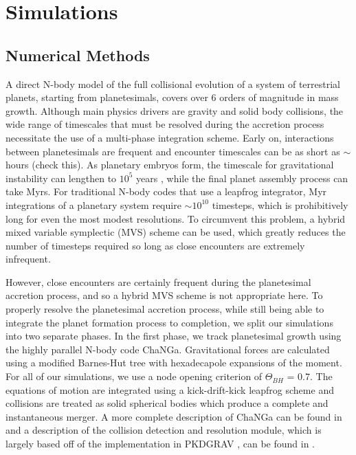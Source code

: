 \section{Simulations} \label{sec:simulations}

\subsection{Numerical Methods} \label{sec:numerical}

A direct N-body model of the full collisional evolution of a system of terrestrial planets, starting from planetesimals, covers over 
6 orders of magnitude in mass growth. Although main physics drivers are gravity and solid body collisions, the wide range of 
timescales that must be resolved during the accretion process necessitate the use of a multi-phase integration scheme. Early 
on, interactions between planetesimals are frequent and encounter timescales can be as short as $\sim$ hours (check this). 
As planetary embryos form, the timescale for gravitational instability can lengthen to $10^{5}$ years \cite{chambers96}, while 
the final planet assembly process can take Myrs. For traditional N-body codes that use a leapfrog integrator, Myr integrations 
of a planetary system require $\sim 10^{10}$ timesteps, which is prohibitively long for even the most modest resolutions. To 
circumvent this problem, a hybrid mixed variable symplectic (MVS) scheme \cite{chambers99} can be used, which greatly 
reduces the number of timesteps required so long as close encounters are extremely infrequent.

However, close encounters are certainly frequent during the planetesimal accretion process, and so a hybrid MVS scheme is 
not appropriate here. To properly resolve the planetesimal accretion process, while still being able to integrate the planet 
formation process to completion, we split our simulations into two separate phases. In the first phase, we track planetesimal 
growth using the highly parallel N-body code {\sc ChaNGa}. Gravitational forces are calculated using a modified Barnes-Hut 
\cite{barnes86} tree with hexadecapole expansions of the moment. For all of our simulations, we use a node opening criterion 
of $\Theta_{BH}$ = 0.7. The equations of motion are integrated using a kick-drift-kick leapfrog scheme and collisions are 
treated as solid spherical bodies which produce a complete and instantaneous merger. A more complete description of  
{\sc ChaNGa} can be found in \cite{jetley08, menon15} and a description of the collision detection and resolution module, 
which is largely based off of the implementation in PKDGRAV \cite{richardson94, richardson00}, can be found in 
\cite{wallace19}.

